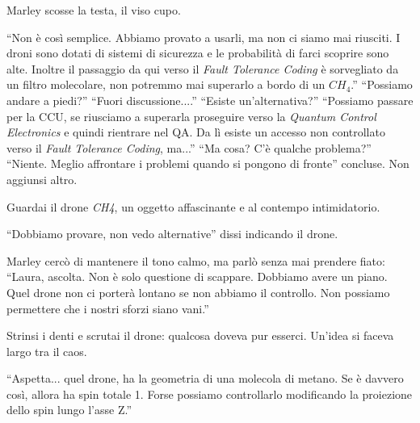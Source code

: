 Marley scosse la testa, il viso cupo.

\begin{dialogue}
 \enquote{Non è così semplice. Abbiamo provato a usarli, ma non ci siamo mai riusciti. I droni sono dotati di sistemi di sicurezza e le probabilità di farci scoprire sono alte. Inoltre il passaggio da qui verso il \textit{Fault Tolerance Coding} è sorvegliato da un filtro molecolare, non potremmo mai superarlo a bordo di un $CH_4$.}
 \enquote{Possiamo andare a piedi?}
 \enquote{Fuori discussione....}
 \enquote{Esiste un'alternativa?}
 \enquote{Possiamo passare per la CCU, se riusciamo a superarla proseguire verso la \textit{Quantum Control Electronics}  e quindi rientrare nel QA. Da lì esiste un accesso non controllato verso il \textit{Fault Tolerance Coding}, ma...}
 \enquote{Ma cosa? C'è qualche problema?}
 \enquote{Niente. Meglio affrontare i problemi quando si pongono di fronte} concluse. Non aggiunsi altro. 
\end{dialogue}

Guardai il drone \textit{CH4}, un oggetto affascinante e al contempo intimidatorio.

\begin{dialogue}
 \enquote{Dobbiamo provare, non vedo alternative} dissi indicando il drone.
\end{dialogue}

\begin{dialogue}
 Marley cercò di mantenere il tono calmo, ma parlò senza mai prendere fiato: \enquote{Laura, ascolta. Non è solo questione di scappare. Dobbiamo avere un piano. Quel drone non ci porterà lontano se non abbiamo il controllo. Non possiamo permettere che i nostri sforzi siano vani.}
\end{dialogue}





Strinsi i denti e scrutai il drone: qualcosa doveva pur esserci. Un'idea si faceva largo tra il caos.

\begin{dialogue}
 \enquote{Aspetta... quel drone, ha la geometria di una molecola di metano. Se è davvero così, allora ha spin totale 1. Forse possiamo controllarlo modificando la proiezione dello spin lungo l'asse Z.}
\end{dialogue}

